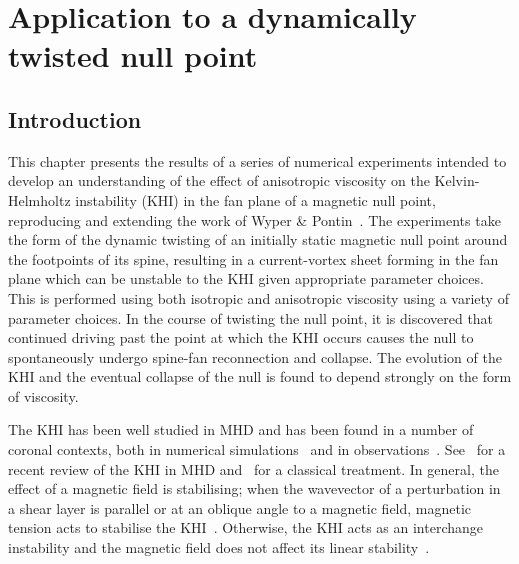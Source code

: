 \chapter{Application to a dynamically twisted null point}
\label{chp:null_point_khi}

\graphicspath{{images/null_point_khi/}}

\section{Introduction}

This chapter presents the results of a series of numerical experiments intended to develop an understanding of the effect of anisotropic viscosity on the Kelvin-Helmholtz instability (KHI) in the fan plane of a magnetic null point, reproducing and extending the work of Wyper \& Pontin~\cite{wyperKelvinHelmholtzInstabilityCurrentvortex2013}. The experiments take the form of the dynamic twisting of an initially static magnetic null point around the footpoints of its spine, resulting in a current-vortex sheet forming in the fan plane which can be unstable to the KHI given appropriate parameter choices. This is performed using both isotropic and anisotropic viscosity using a variety of parameter choices. In the course of twisting the null point, it is discovered that continued driving past the point at which the KHI occurs causes the null to spontaneously undergo spine-fan reconnection and collapse. The evolution of the KHI and the eventual collapse of the null is found to depend strongly on the form of viscosity.

The KHI has been well studied in MHD and has been found in a number of coronal contexts, both in numerical simulations~\cite{howsonEffectsResistivityViscosity2017,wyperKelvinHelmholtzInstabilityCurrentvortex2013} and in observations~\cite{foullonMAGNETICKELVINHELMHOLTZINSTABILITY2011,yangObservationKelvinHelmholtz2018}. See~\cite{faganelloMagnetizedKelvinHelmholtz2017} for a recent review of the KHI in MHD and~\cite{chandrasekharHydrodynamicHydromagneticStability1981} for a classical treatment. In general, the effect of a magnetic field is stabilising; when the wavevector of a perturbation in a shear layer is parallel or at an oblique angle to a magnetic field, magnetic tension acts to stabilise the KHI~\cite{chandrasekharHydrodynamicHydromagneticStability1981,ryuMagnetohydrodynamicKelvinHelmholtzInstability2000}. Otherwise, the KHI acts as an interchange instability and the magnetic field does not affect its linear stability~\cite{chandrasekharHydrodynamicHydromagneticStability1981}.

